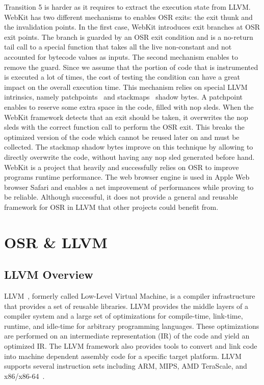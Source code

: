 Transition 5 is harder as it requires to extract the execution state from LLVM.
WebKit has two different mechanisms to enables OSR exits: the exit thunk and the invalidation points.
In the first case, WebKit introduces exit branches at OSR exit points.
The branch is guarded by an OSR exit condition and is a no-return tail call to a special function that takes all the live non-constant and not accounted for bytecode values as inputs.
The second mechanism enables to remove the guard.
Since we assume that the portion of code that is instrumented is executed a lot of times, the cost of testing the condition can have a great impact on the overall execution time.
This mechanism relies on special LLVM intrinsics, namely patchpoints~\cite{llvmPatchpoints} and stackmaps~\cite{llvmStackMap} shadow bytes.
A patchpoint enables to reserve some extra space in the code, filled with nop sleds. 
When the WebKit framework detects that an exit should be taken, it overwrites the nop sleds with the correct function call to perform the OSR exit.
This breaks the optimized version of the code which cannot be reused later on and must be collected.
The stackmap shadow bytes improve on this technique by allowing to directly overwrite the code, without having any nop sled generated before hand.\\

WebKit is a project that heavily and successfully relies on OSR to improve programs runtime performance.
The web browser engine is used in Apple Web browser Safari and enables a net improvement of performances while proving to be reliable.
Although successful, it does not provide a general and reusable framework for OSR in LLVM that other projects could benefit from.\\

\section{OSR \& LLVM}\label{OSR&VM}
\subsection{LLVM Overview}
LLVM~\cite{llvmUrl, lattner2004llvm}, formerly called Low-Level Virtual Machine, is a compiler infrastructure that provides a set of reusable libraries.
LLVM provides the middle layers of a compiler system and a large set of optimizations for compile-time, link-time, runtime, and idle-time for arbitrary programming languages.
These optimizations are performed on an intermediate representation (IR) of the code and yield an optimized IR.
The LLVM framework also provides tools to convert and link code into machine dependent assembly code for a specific target platform.
LLVM supports several instruction sets including ARM, MIPS, AMD TeraScale, and x86/x86-64~\cite{llvmUrl}.\\

